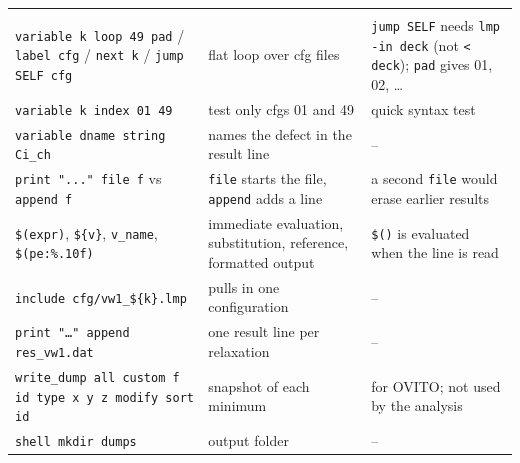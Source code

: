 \documentclass[10pt]{article}
\newcommand{\cmd}[1]{\texttt{\small #1}}
\begin{document}
\begin{xltabular}{\linewidth}{L{5.0cm} L{6.1cm} Y}
 \\
\cmd{variable k loop 49 pad} / \cmd{label cfg} / \cmd{next k} / \cmd{jump SELF cfg} & flat loop over cfg files & \cmd{jump SELF} needs \cmd{lmp -in deck} (not \cmd{< deck}); \cmd{pad} gives 01, 02, … \\
\cmd{variable k index 01 49} & test only cfgs 01 and 49 & quick syntax test \\
\cmd{variable dname string Ci\_ch} & names the defect in the result line & -- \\
\cmd{print "..." file f} vs \cmd{append f} & \cmd{file} starts the file, \cmd{append} adds a line & a second \cmd{file} would erase earlier results \\
\cmd{\$(expr)}, \cmd{\$\{v\}}, \cmd{v\_name}, \cmd{\$(pe:\%.10f)} & immediate evaluation, substitution, reference, formatted output & \cmd{\$()} is evaluated when the line is read \\
\cmd{include cfg/vw1\_\$\{k\}.lmp} & pulls in one configuration & -- \\
\cmd{print "…" append res\_vw1.dat} & one result line per relaxation & -- \\
\cmd{write\_dump all custom f id type x y z modify sort id} & snapshot of each minimum & for OVITO; not used by the analysis \\
\cmd{shell mkdir dumps} & output folder & -- \\
\bottomrule
\end{xltabular}
\end{document}
